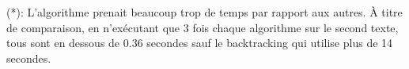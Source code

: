 \documentclass[a4paper, 11pt]{article}
\begin{document}
(*): L'algorithme prenait beaucoup trop de temps par rapport aux autres. À titre
de comparaison, en n'exécutant que 3 fois chaque algorithme sur le second texte,
tous sont en dessous de 0.36 secondes sauf le backtracking qui utilise plus de
14 secondes.


\newpage


\end{document}
